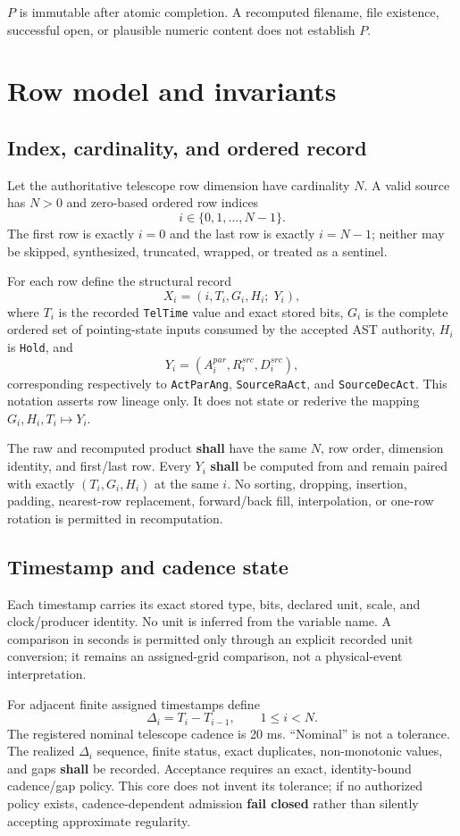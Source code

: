 \documentclass[11pt]{article}
\newcommand{\code}[1]{\texttt{#1}}
\newcommand{\shall}{\textbf{shall}}
\newcommand{\failclosed}{\textbf{fail closed}}
\begin{document}
$P$ is immutable after atomic completion.  A recomputed filename, file
existence, successful open, or plausible numeric content does not establish
$P$.

\section{Row model and invariants}

\subsection{Index, cardinality, and ordered record}

Let the authoritative telescope row dimension have cardinality $N$.  A valid
source has $N>0$ and zero-based ordered row indices
\[
i \in \{0,1,\ldots,N-1\}.
\]
The first row is exactly $i=0$ and the last row is exactly $i=N-1$; neither may
be skipped, synthesized, truncated, wrapped, or treated as a sentinel.

For each row define the structural record
\[
X_i=(i,T_i,G_i,H_i;\;Y_i),
\]
where $T_i$ is the recorded \code{TelTime} value and exact stored bits, $G_i$
is the complete ordered set of pointing-state inputs consumed by the accepted
AST authority, $H_i$ is \code{Hold}, and
\[
Y_i=(A^{par}_i,R^{src}_i,D^{src}_i),
\]
corresponding respectively to \code{ActParAng}, \code{SourceRaAct}, and
\code{SourceDecAct}.
This notation asserts row lineage only.  It does not state or rederive the
mapping $G_i,H_i,T_i\mapsto Y_i$.

The raw and recomputed product \shall{} have the same $N$, row order, dimension
identity, and first/last row.  Every $Y_i$ \shall{} be computed from and remain
paired with exactly $(T_i,G_i,H_i)$ at the same $i$.  No sorting, dropping,
insertion, padding, nearest-row replacement, forward/back fill, interpolation,
or one-row rotation is permitted in recomputation.

\subsection{Timestamp and cadence state}

Each timestamp carries its exact stored type, bits, declared unit, scale, and
clock/producer identity.  No unit is inferred from the variable name.  A
comparison in seconds is permitted only through an explicit recorded unit
conversion; it remains an assigned-grid comparison, not a physical-event
interpretation.

For adjacent finite assigned timestamps define
\[
\Delta_i=T_i-T_{i-1},\qquad 1\le i<N.
\]
The registered nominal telescope cadence is 20 ms.  ``Nominal'' is not a
tolerance.  The realized $\Delta_i$ sequence, finite status, exact duplicates,
non-monotonic values, and gaps \shall{} be recorded.  Acceptance requires an
exact, identity-bound cadence/gap policy.  This core does not invent its
tolerance; if no authorized policy exists, cadence-dependent admission
\failclosed{} rather than silently accepting approximate regularity.
\end{document}
